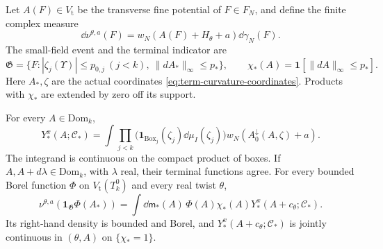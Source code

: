 Let $A(F)\in V_{\mathrm t}$ be the transverse fine
potential of $F\in F_N$, and define the finite complex
measure
\[
 \dd\nu^{\theta,a}(F)=
               w_N(A(F)+H_\theta+a)\dd\gamma_N(F).
\]
The small-field event and the terminal indicator are
\begin{equation}\label{eq:term-small-field-event}
 \mathfrak G=\{F:|\zeta_j(\Upsilon)|\le p_{0,j}\ (j<k),
                                 \ \|dA_*\|_\infty\le p_*\},\qquad
 \chi_*(A)=\mathbf1[\|dA\|_\infty\le p_*].
\end{equation}
Here $A_*,\zeta$ are the actual coordinates
\eqref{eq:term-curvature-coordinates}.
Products with $\chi_*$ are extended by zero off
its support.

\begin{theorem}\label{thm:term-density}
For every $A\in\mathrm{Dom}_k$,
\begin{equation}\label{eq:term-iterated-density}
 Y_*^x(A;\mathscr C_*)
      =\int\prod_{j<k}
                    \big(\mathbf1_{\mathrm{Box}_j}(\zeta_j)
                                             \dd\mu_I(\zeta_j)\big)
                       w_N(A_0^\downarrow(A,\zeta)+a).
\end{equation}
The integrand is continuous on the compact product
of boxes.
If $A,A+d\lambda\in\mathrm{Dom}_k$, with $\lambda$
real, their terminal functions agree.
For every bounded Borel function $\Phi$ on
$V_{\mathrm t}(T_k^0)$ and every real twist $\theta$,
\begin{equation}\label{eq:term-Borel-observable}
 \nu^{\theta,a}(\mathbf1_{\mathfrak G}\Phi(A_*))
    =\int\dd\mathsf m_*(A)\,
                        \Phi(A)\chi_*(A)Y_*^x(A+c_\theta;\mathscr C_*).
\end{equation}
Its right-hand density is bounded and Borel, and
$Y_*^x(A+c_\theta;\mathscr C_*)$ is jointly continuous
in $(\theta,A)$ on $\{\chi_*=1\}$.
\end{theorem}

